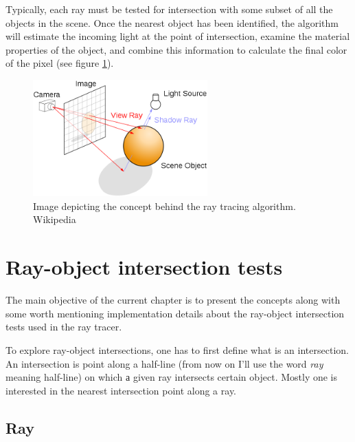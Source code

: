 \documentclass{article}
\begin{document}
Typically, each ray must be tested for intersection with some subset of all the objects in the scene. Once the nearest object has been identified, the algorithm will estimate the incoming light at the point of intersection, examine the material properties of the object, and combine this information to calculate the final color of the pixel (see figure \ref{fig:concept}). 

\begin{figure}[h]
	\centering
    \includegraphics[width=0.6\textwidth]{ray_trace_algo}
	\caption{Image depicting the concept behind the ray tracing algorithm. Wikipedia}
    \label{fig:concept}
\end{figure}


\section{Ray-object intersection tests}
\label{sec:isects}
The main objective of the current chapter is to present the concepts along with some worth mentioning implementation details about the ray-object intersection tests used in the ray tracer.

\vspace*{\baselineskip}

To explore ray-object intersections, one has to first define what is an intersection. An intersection is point along a half-line (from now on I'll use the word \textit{ray} meaning half-line) on which а given ray intersects certain object. Mostly one is interested in the nearest intersection point along a ray.

\subsection{Ray}
\end{document}
